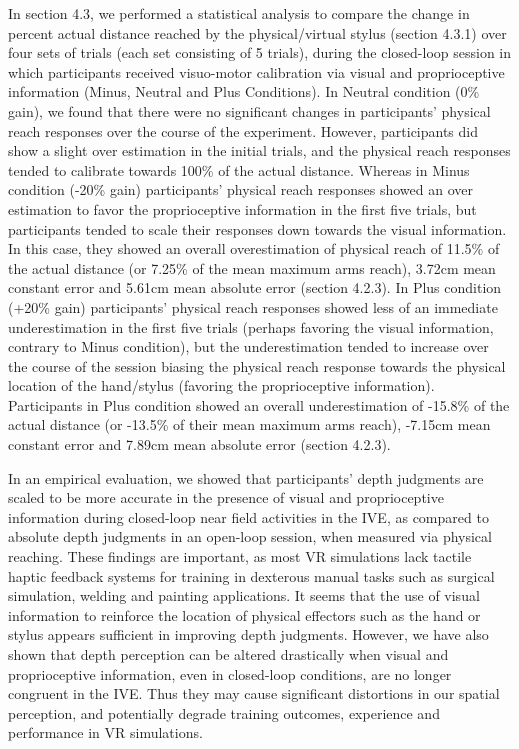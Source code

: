 In section 4.3, we performed a statistical analysis to compare the change in percent actual distance reached by the physical/virtual stylus (section 4.3.1) over four sets of trials (each set consisting of 5 trials), during the closed-loop session in which participants received visuo-motor calibration via visual and proprioceptive information (Minus, Neutral and Plus Conditions). In Neutral condition (0\% gain), we found that there were no significant changes in participants' physical reach responses over the course of the experiment. However, participants did show a slight over estimation in the initial trials, and the physical reach responses tended to calibrate towards 100\% of the actual distance. Whereas in Minus condition (-20\% gain) participants' physical reach responses showed an over estimation to favor the proprioceptive information in the first five trials, but participants tended to scale their responses down towards the visual information. In this case, they showed an overall overestimation of physical reach of 11.5\% of the actual distance (or 7.25\% of the mean maximum arms reach), 3.72cm mean constant error and 5.61cm mean absolute error (section 4.2.3). In Plus condition (+20\% gain) participants' physical reach responses showed less of an immediate underestimation in the first five trials (perhaps favoring the visual information, contrary to Minus condition), but the underestimation tended to increase over the course of the session biasing the physical reach response towards the physical location of the hand/stylus (favoring the proprioceptive information). Participants in Plus condition showed an overall underestimation of -15.8\% of the actual distance (or -13.5\% of their mean maximum arms reach), -7.15cm mean constant error and 7.89cm mean absolute error (section 4.2.3).

In an empirical evaluation, we showed that participants' depth judgments are scaled to be more accurate in the presence of visual and proprioceptive information during closed-loop near field activities in the IVE, as compared to absolute depth judgments in an open-loop session, when measured via physical reaching. These findings are important, as most VR simulations lack tactile haptic feedback systems for training in dexterous manual tasks such as surgical simulation, welding and painting applications. It seems that the use of visual information to reinforce the location of physical effectors such as the hand or stylus appears sufficient in improving depth judgments. However, we have also shown that depth perception can be altered drastically when visual and proprioceptive information, even in closed-loop conditions, are no longer congruent in the IVE. Thus they may cause significant distortions in our spatial perception, and potentially degrade training outcomes, experience and performance in VR simulations.

